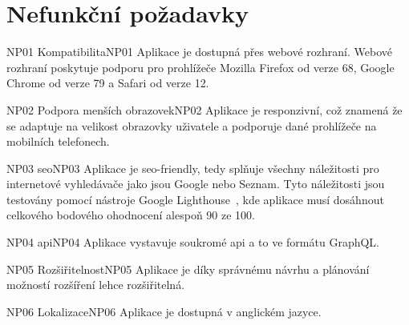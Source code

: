 \section{Nefunkční požadavky}
\label{sc:non_func_req}

\begin{requirment}{NP01 Kompatibilita}{NP01}
    Aplikace je dostupná přes webové rozhraní. Webové rozhraní poskytuje podporu pro prohlížeče Mozilla Firefox od verze 68, Google Chrome od verze 79 a Safari od verze 12.
\end{requirment}

\begin{requirment}{NP02 Podpora menších obrazovek}{NP02}
    Aplikace je responzivní, což znamená že se adaptuje na velikost obrazovky uživatele a podporuje dané prohlížeče na mobilních telefonech.
\end{requirment}

\begin{requirment}{NP03 \acrshort{seo}}{NP03}
    Aplikace je \acrshort{seo}-friendly, tedy splňuje všechny náležitosti pro internetové vyhledávače jako jsou Google nebo Seznam. Tyto náležitosti jsou testovány pomocí nástroje Google Lighthouse~\cite{googlellc_2019_lighthouse}, kde aplikace musí dosáhnout celkového bodového ohodnocení alespoň 90 ze 100.
\end{requirment}

\begin{requirment}{NP04 \acrshort{api}}{NP04}
    Aplikace vystavuje soukromé \acrshort{api} a to ve formátu GraphQL.
\end{requirment}

\begin{requirment}{NP05 Rozšiřitelnost}{NP05}
    Aplikace je díky správnému návrhu a plánování možností rozšíření lehce rozšiřitelná.
\end{requirment}

\begin{requirment}{NP06 Lokalizace}{NP06}
    Aplikace je dostupná v anglickém jazyce.
\end{requirment}

